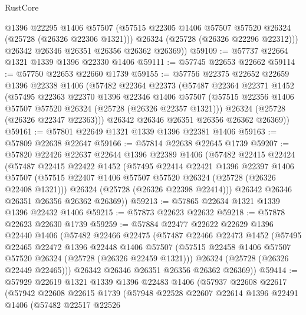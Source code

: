 \begin{lexlean}{RustCore}
\begin{coremodule}
          @1396
          @22295
          @1406
          @57507
          (@57515 @22305 @1406 @57507 @57520 @26324 (@25728 (@26326 @22306 @1321)))
          @26324
          (@25728 (@26326 @22296 @22312)))
        @26342
        @26346
        @26351
        @26356
        @26362
        @26369))
@59109 := @57737 @22664 @1321 @1339 @1396 @22330 @1406
@59111 := @57745 @22653 @22662
@59114 := @57750 @22653 @22660 @1739
@59155 := @57756
    @22375
    @22652
    @22659
    @1396
    @22338
    @1406
    (@57482
      @22364
      @22373
      (@57487
        @22364
        @22371
        @1452
        (@57495
          @22363
          @22370
          @1396
          @22346
          @1406
          @57507
          (@57515 @22356 @1406 @57507 @57520 @26324 (@25728 (@26326 @22357 @1321)))
          @26324
          (@25728 (@26326 @22347 @22363)))
        @26342
        @26346
        @26351
        @26356
        @26362
        @26369))
@59161 := @57801 @22649 @1321 @1339 @1396 @22381 @1406
@59163 := @57809 @22638 @22647
@59166 := @57814 @22638 @22645 @1739
@59207 := @57820
    @22426
    @22637
    @22644
    @1396
    @22389
    @1406
    (@57482
      @22415
      @22424
      (@57487
        @22415
        @22422
        @1452
        (@57495
          @22414
          @22421
          @1396
          @22397
          @1406
          @57507
          (@57515 @22407 @1406 @57507 @57520 @26324 (@25728 (@26326 @22408 @1321)))
          @26324
          (@25728 (@26326 @22398 @22414)))
        @26342
        @26346
        @26351
        @26356
        @26362
        @26369))
@59213 := @57865 @22634 @1321 @1339 @1396 @22432 @1406
@59215 := @57873 @22623 @22632
@59218 := @57878 @22623 @22630 @1739
@59259 := @57884
    @22477
    @22622
    @22629
    @1396
    @22440
    @1406
    (@57482
      @22466
      @22475
      (@57487
        @22466
        @22473
        @1452
        (@57495
          @22465
          @22472
          @1396
          @22448
          @1406
          @57507
          (@57515 @22458 @1406 @57507 @57520 @26324 (@25728 (@26326 @22459 @1321)))
          @26324
          (@25728 (@26326 @22449 @22465)))
        @26342
        @26346
        @26351
        @26356
        @26362
        @26369))
@59414 := @57929
    @22619
    @1321
    @1339
    @1396
    @22483
    @1406
    (@57937
      @22608
      @22617
      (@57942
        @22608
        @22615
        @1739
        (@57948
          @22528
          @22607
          @22614
          @1396
          @22491
          @1406
          (@57482
            @22517
            @22526

\end{coremodule}
\end{lexlean}
